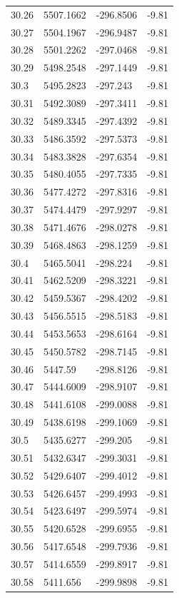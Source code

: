 \begin{table}[H]
\begin{tabular}{llll}
30.26 & 5507.1662 & -296.8506 & -9.81 \\
30.27 & 5504.1967 & -296.9487 & -9.81 \\
30.28 & 5501.2262 & -297.0468 & -9.81 \\
30.29 & 5498.2548 & -297.1449 & -9.81 \\
30.3 & 5495.2823 & -297.243 & -9.81 \\
30.31 & 5492.3089 & -297.3411 & -9.81 \\
30.32 & 5489.3345 & -297.4392 & -9.81 \\
30.33 & 5486.3592 & -297.5373 & -9.81 \\
30.34 & 5483.3828 & -297.6354 & -9.81 \\
30.35 & 5480.4055 & -297.7335 & -9.81 \\
30.36 & 5477.4272 & -297.8316 & -9.81 \\
30.37 & 5474.4479 & -297.9297 & -9.81 \\
30.38 & 5471.4676 & -298.0278 & -9.81 \\
30.39 & 5468.4863 & -298.1259 & -9.81 \\
30.4 & 5465.5041 & -298.224 & -9.81 \\
30.41 & 5462.5209 & -298.3221 & -9.81 \\
30.42 & 5459.5367 & -298.4202 & -9.81 \\
30.43 & 5456.5515 & -298.5183 & -9.81 \\
30.44 & 5453.5653 & -298.6164 & -9.81 \\
30.45 & 5450.5782 & -298.7145 & -9.81 \\
30.46 & 5447.59 & -298.8126 & -9.81 \\
30.47 & 5444.6009 & -298.9107 & -9.81 \\
30.48 & 5441.6108 & -299.0088 & -9.81 \\
30.49 & 5438.6198 & -299.1069 & -9.81 \\
30.5 & 5435.6277 & -299.205 & -9.81 \\
30.51 & 5432.6347 & -299.3031 & -9.81 \\
30.52 & 5429.6407 & -299.4012 & -9.81 \\
30.53 & 5426.6457 & -299.4993 & -9.81 \\
30.54 & 5423.6497 & -299.5974 & -9.81 \\
30.55 & 5420.6528 & -299.6955 & -9.81 \\
30.56 & 5417.6548 & -299.7936 & -9.81 \\
30.57 & 5414.6559 & -299.8917 & -9.81 \\
30.58 & 5411.656 & -299.9898 & -9.81 \\

\end{tabular}
\end{table}
